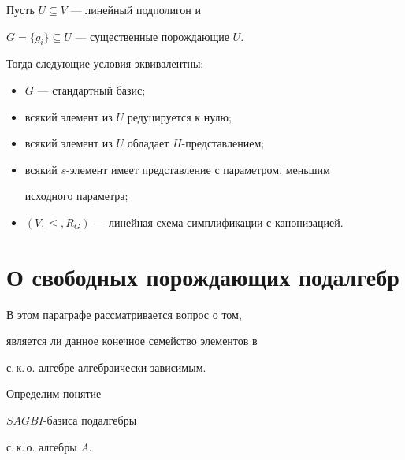 \begin{thm}


Пусть $U\subseteq V$ --- линейный подполигон и


$G=\lbrace g_{i}\rbrace\subseteq U$ --- существенные порождающие $U$.


Тогда следующие условия эквивалентны\/${:}$


\begin{itemize}


\item[(i)] $G$ --- стандартный базис$;$


\item[(ii)] всякий элемент из $U$ редуцируется к нулю$;$


\item[(iii)] всякий элемент из $U$ обладает $H$-представлением$;$


\item[(iv)] всякий $s$-элемент имеет представление с параметром, меньшим


исходного параметра$;$


\item[(v)] $(V,\leq,R_{G})$ --- линейная схема симплификации с канонизацией.


\end{itemize}


\end{thm}








\section{О свободных порождающих подалгебр}





В этом параграфе рассматривается вопрос о том,


является ли данное конечное семейство элементов в 


с.\,к.\,о. алгебре алгебраически зависимым.










Определим понятие


$SAGBI$-базиса подалгебры


с.\,к.\,о. алгебры $A$.


